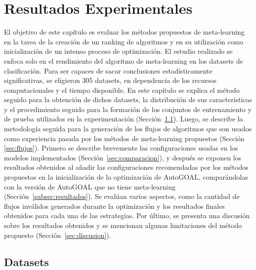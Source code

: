 \chapter{Resultados Experimentales}\label{chapter:results}

El objetivo de este capítulo es evaluar los métodos propuestos de meta-learning en la tarea de la creación de un ranking de algoritmos y en su utilización como inicialización de un intenso proceso de optimización. El estudio realizado se enfoca solo en el rendimiento del algoritmo de meta-learning en los datasets de clasificación. Para ser capaces de sacar conclusiones estadísticamente significativas, se eligieron 305 datasets, en dependencia de los recursos computacionales y el tiempo disponible. En este capítulo se explica el método seguido para la obtención de dichos datasets, la distribución de sus características y el procedimiento seguido para la formación de los conjuntos de entrenamiento y de prueba utilizados en la experimentación (Sección~\ref{sec:datasets}). Luego, se describe la metodología seguida para la generación de los flujos de algoritmos que son usados como experiencia pasada por los métodos de meta-learning propuestos (Sección \ref{sec:flujos}). Primero se describe brevemente las configuraciones usadas en los modelos implementados (Sección~\ref{sec:comparacion}), y después 
se exponen los resultados obtenidos al añadir las configuraciones recomendadas por los métodos propuestos en la inicialización de la optimización de AutoGOAL, comparándolas con la versión de AutoGOAL que no tiene meta-learning (Sección~\ref{subsec:resultados}). Se evalúan varios aspectos, como la cantidad de flujos inválidos generados durante la optimización y los resultados finales obtenidos para cada una de las estrategias. Por último, se presenta una discusión sobre los resultados obtenidos y se mencionan algunas limitaciones del método propuesto (Sección~\ref{sec:discusion}).


\section{Datasets}\label{sec:datasets}

%
%
%

